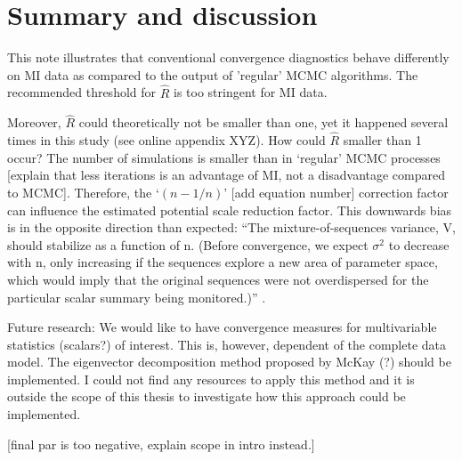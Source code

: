 \documentclass[article]{jss}
\begin{document}







\section{Summary and discussion} \label{sec:summary}

This note illustrates that conventional convergence diagnostics behave differently on MI data as compared to the output of 'regular' MCMC algorithms. The recommended threshold for $\widehat{R}$ is too stringent for MI data.

Moreover, $\widehat{R}$ could theoretically not be smaller than one, yet it happened several times in this study (see online appendix XYZ). How could $\widehat{R}$ smaller than 1 occur? The number of simulations is smaller than in `regular' MCMC processes [explain that less iterations is an advantage of MI, not a disadvantage compared to MCMC]. Therefore, the `$(n-1/n)$' [add equation number] correction factor can influence the estimated potential scale reduction factor. This downwards bias is in the opposite direction than expected: ``The mixture-of-sequences variance, V, should stabilize as a function of n. (Before convergence, we expect $\sigma^2$ to decrease with n, only increasing if the sequences explore a new area of parameter space, which would imply that the original sequences were not overdispersed for the particular scalar summary being monitored.)'' \cite[p~438]{broo98}.


Future research: We would like to have convergence measures for multivariable statistics (scalars?) of interest. This is, however, dependent of the complete data model. The eigenvector decomposition method proposed by McKay (?) should be implemented. I could not find any resources to apply this method and it is outside the scope of this thesis to investigate how this approach could be implemented.

[final par is too negative, explain scope in intro instead.]

\end{document}
